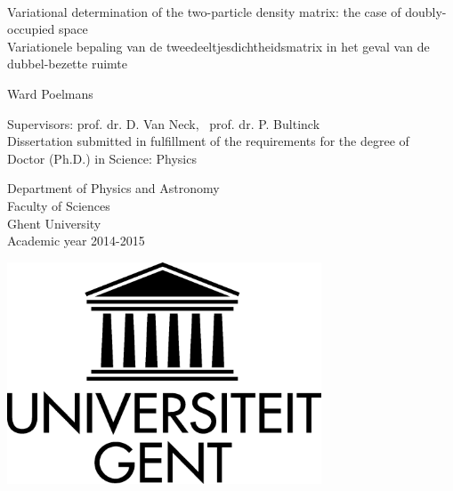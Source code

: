 
{\large \ \vspace{0.25\textheight} \\

\hspace{-\parindent}Variational determination of the two-particle density matrix: the case of doubly-occupied space\\

\hspace{-\parindent}Variationele bepaling van de tweedeeltjesdichtheidsmatrix in het geval van de dubbel-bezette ruimte


\vspace{0.5cm}
\hspace{-\parindent}Ward Poelmans

}

\vspace*{\fill}
\hspace{-\parindent}Supervisors: prof. dr. D. Van Neck,~ prof. dr. P. Bultinck\\
\hspace{-\parindent}Dissertation submitted in fulfillment of the requirements for the degree of\\
\hspace{-\parindent}Doctor (Ph.D.) in Science: {Physics}\\


\vspace{0.5cm}

\hspace{-\parindent}\begin{minipage}{0.7\textwidth}
  \hspace{-\parindent}Department of Physics and Astronomy\\
  \hspace{-\parindent}Faculty of Sciences\\
  \hspace{-\parindent}Ghent University\\
  \hspace{-\parindent}Academic year 2014-2015
\end{minipage}
\begin{minipage}{0.3\textwidth}
  \begin{flushright}
    \includegraphics[width=0.7\textwidth]{./figures/logo-ugent}
  \end{flushright}
\end{minipage}


